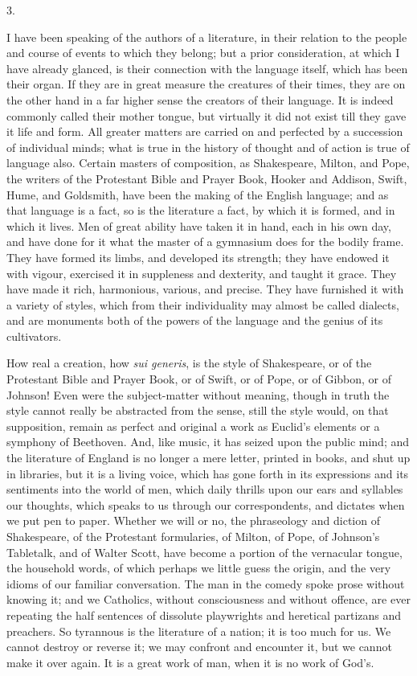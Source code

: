 3.

I have been speaking of the authors of a literature, in their
relation to the people and course of events to which they belong; but
a prior consideration, at which I have already glanced, is their
connection with the language itself, which has been their organ. If
they are in great measure the creatures of their times, they are on
the other hand in a far higher sense the creators of their language.
It is indeed commonly called their mother tongue, but virtually it did
not exist till they gave it life and form. All greater matters are
carried on and perfected by a succession of individual minds; what is
true in the history of thought and of action is true of language also.
Certain masters of composition, as Shakespeare, Milton, and Pope, the
writers of the Protestant Bible and Prayer Book, Hooker and Addison,
Swift, Hume, and Goldsmith, have been the making of the English
language; and as that language is a fact, so is the literature a fact,
by which it is formed, and in which it lives. Men of great ability
have taken it in hand, each in his own day, and have done for it
what the master of a gymnasium does for the bodily frame. They have
formed its limbs, and developed its strength; they have endowed it
with vigour, exercised it in suppleness and dexterity, and taught it
grace. They have made it rich, harmonious, various, and precise. They
have furnished it with a variety of styles, which from their
individuality may almost be called dialects, and are monuments both of
the powers of the language and the genius of its cultivators.

How real a creation, how \emph{sui generis}, is the style of
Shakespeare, or of the Protestant Bible and Prayer Book, or of Swift,
or of Pope, or of Gibbon, or of Johnson! Even were the subject-matter
without meaning, though in truth the style cannot really be abstracted
from the sense, still the style would, on that supposition, remain as
perfect and original a work as Euclid's elements or a symphony of
Beethoven. And, like music, it has seized upon the public mind; and
the literature of England is no longer a mere letter, printed in
books, and shut up in libraries, but it is a living voice, which has
gone forth in its expressions and its sentiments into the world of
men, which daily thrills upon our ears and syllables our thoughts,
which speaks to us through our correspondents, and dictates when we
put pen to paper. Whether we will or no, the phraseology and diction
of Shakespeare, of the Protestant formularies, of Milton, of Pope, of
Johnson's Tabletalk, and of Walter Scott, have become a portion of the
vernacular tongue, the household words, of which perhaps we little
guess the origin, and the very idioms of our familiar conversation.
The man in the comedy spoke prose without knowing it; and we
Catholics, without consciousness and without offence, are ever
repeating the half sentences of dissolute playwrights and
heretical partizans and preachers. So tyrannous is the literature of a
nation; it is too much for us. We cannot destroy or reverse it; we may
confront and encounter it, but we cannot make it over again. It is a
great work of man, when it is no work of God's.


